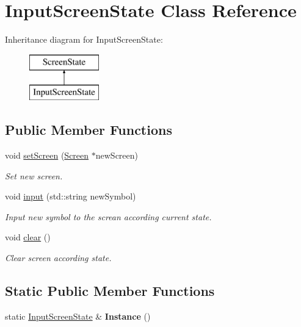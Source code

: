 \hypertarget{class_input_screen_state}{}\section{Input\+Screen\+State Class Reference}
\label{class_input_screen_state}
Inheritance diagram for Input\+Screen\+State\+:\begin{figure}[H]
\begin{center}
\leavevmode
\includegraphics[height=2.000000cm]{class_input_screen_state}
\end{center}
\end{figure}
\subsection*{Public Member Functions}
\begin{DoxyCompactItemize}
\item 
void \hyperlink{class_input_screen_state_acc41e5841cd19d4a55603793b6fb8180}{set\+Screen} (\hyperlink{class_screen}{Screen} $\ast$new\+Screen)
\begin{DoxyCompactList}\small\item\em Set new screen. \end{DoxyCompactList}\item 
void \hyperlink{class_input_screen_state_a2189d602f5fe02660488a5a49c4c76f8}{input} (std\+::string new\+Symbol)
\begin{DoxyCompactList}\small\item\em Input new symbol to the screan according current state. \end{DoxyCompactList}\item 
\hypertarget{class_input_screen_state_a1c2b747f0aa827cc5d60c56c154d4573}{}void \hyperlink{class_input_screen_state_a1c2b747f0aa827cc5d60c56c154d4573}{clear} ()\label{class_input_screen_state_a1c2b747f0aa827cc5d60c56c154d4573}

\begin{DoxyCompactList}\small\item\em Clear screen according state. \end{DoxyCompactList}\end{DoxyCompactItemize}
\subsection*{Static Public Member Functions}
\begin{DoxyCompactItemize}
\item 
\hypertarget{class_input_screen_state_acc5cad3f3defa6541ecea1921e2ce32e}{}static \hyperlink{class_input_screen_state}{Input\+Screen\+State} \& {\bfseries Instance} ()\label{class_input_screen_state_acc5cad3f3defa6541ecea1921e2ce32e}

\end{DoxyCompactItemize}
